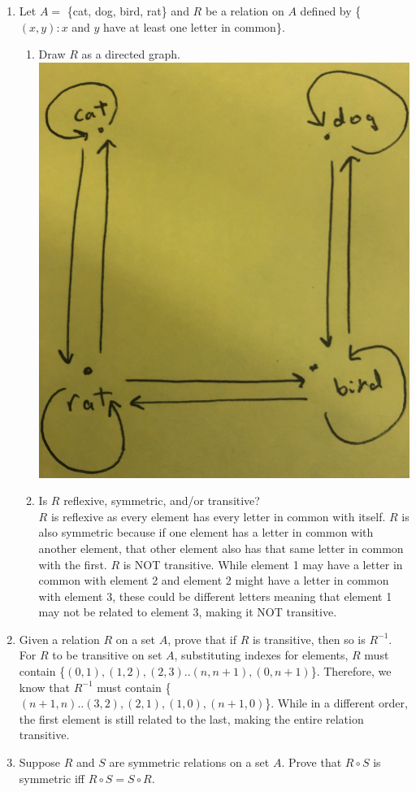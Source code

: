 \documentclass{article}
\begin{document}
\begin{enumerate}
\item Let $ A = $ \{cat, dog, bird, rat\} and $R$ be a relation on $A$ defined by \{$(x,y): x$ and $y$ have at least one letter in common\}. \\
\begin{enumerate}
    \item  Draw $R$ as a directed graph. \\
    \includegraphics[scale=0.05]{image0.jpg}
    \item  Is $R$ reflexive, symmetric, and/or transitive? \\
    $R$ is reflexive as every element has every letter in common with itself. $R$ is also symmetric because if one element has a letter in common with another element, that other element also has that same letter in common with the first. $R$ is NOT transitive. While element 1 may have a letter in common with element 2 and element 2 might have a letter in common with element 3, these could be different letters meaning that element 1 may not be related to element 3, making it NOT transitive.
\end{enumerate}

\item Given a relation $R$ on a set $A$, prove that if $R$ is transitive, then so is $R^{-1}$. \\
For $R$ to be transitive on set $A$, substituting indexes for elements, $R$ must contain \{$(0,1),(1,2),(2,3)..(n,n+1),(0,n+1)$\}. Therefore, we know that $R^{-1}$ must contain \{$(n+1,n)..(3,2),(2,1),(1,0),(n+1,0)$\}. While in a different order, the first element is still related to the last, making the entire relation transitive. 

\item Suppose $R$ and $S$ are symmetric relations on a set $A$. Prove that $R \circ S $ is symmetric iff $R \circ S = S \circ R$.
\end{enumerate}
\end{document}
